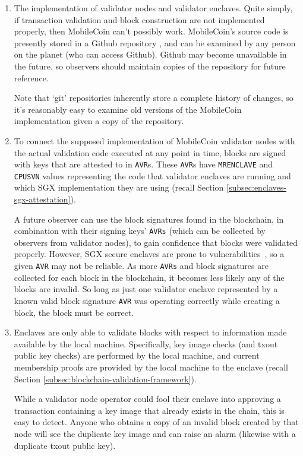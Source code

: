 \begin{enumerate}
    \item The implementation of validator nodes and validator enclaves. Quite simply, if transaction validation and block construction are not implemented properly, then MobileCoin can't possibly work. MobileCoin's source code is presently stored in a Github repository \cite{mobilecoin-source-code}, and can be examined by any person on the planet (who can access Github). Github may become unavailable in the future, so observers should maintain copies of the repository for future reference.
    
    Note that `git' repositories inherently store a complete history of changes, so it's reasonably easy to examine old versions of the MobileCoin implementation given a copy of the repository.

    \item To connect the supposed implementation of MobileCoin validator nodes with the actual validation code executed at any point in time, blocks are signed with keys that are attested to in {\tt AVR}s. These {\tt AVR}s have {\tt MRENCLAVE} and {\tt CPUSVN} values representing the code that validator enclaves are running and which SGX implementation they are using (recall Section \ref{subsec:enclaves-sgx-attestation}).

    A future observer can use the block signatures found in the blockchain, in combination with their signing keys' {\tt AVRs} (which can be collected by observers from validator nodes), to gain confidence that blocks were validated properly. However, SGX secure enclaves are prone to vulnerabilities~\cite{wiki-sgx-attacks}, so a given {\tt AVR} may not be reliable. As more {\tt AVRs} and block signatures are collected for each block in the blockchain, it becomes less likely any of the blocks are invalid. So long as just one validator enclave represented by a known valid block signature {\tt AVR} was operating correctly while creating a block, the block must be correct.

    \item Enclaves are only able to validate blocks with respect to information made available by the local machine. Specifically, key image checks (and txout public key checks) are performed by the local machine, and current membership proofs are provided by the local machine to the enclave (recall Section \ref{subsec:blockchain-validation-framework}).
    
    While a validator node operator could fool their enclave into approving a transaction containing a key image that already exists in the chain, this is easy to detect. Anyone who obtains a copy of an invalid block created by that node will see the duplicate key image and can raise an alarm (likewise with a duplicate txout public key).


\end{enumerate}
